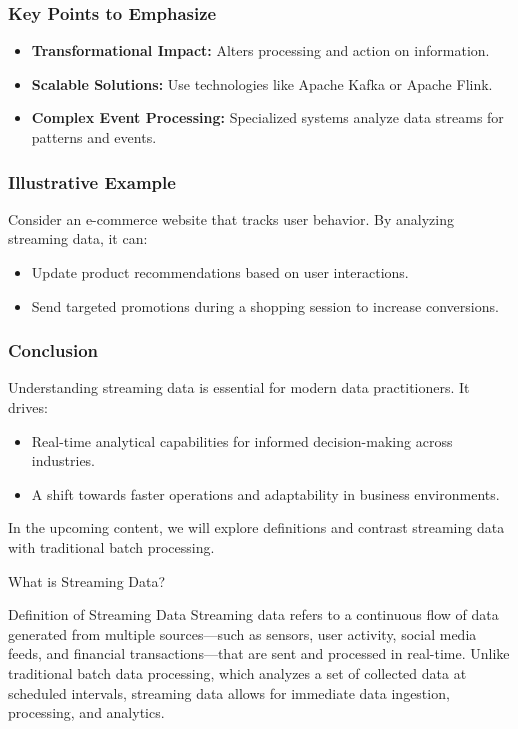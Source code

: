 \documentclass[aspectratio=169]{beamer}
\begin{document}
\begin{frame}[fragile]
    \frametitle{Key Points to Emphasize}
    \begin{itemize}
        \item \textbf{Transformational Impact:} Alters processing and action on information.
        \item \textbf{Scalable Solutions:} Use technologies like Apache Kafka or Apache Flink.
        \item \textbf{Complex Event Processing:} Specialized systems analyze data streams for patterns and events.
    \end{itemize}
\end{frame}

\begin{frame}[fragile]
    \frametitle{Illustrative Example}
    Consider an e-commerce website that tracks user behavior. By analyzing streaming data, it can:
    \begin{itemize}
        \item Update product recommendations based on user interactions.
        \item Send targeted promotions during a shopping session to increase conversions.
    \end{itemize}
\end{frame}

\begin{frame}[fragile]
    \frametitle{Conclusion}
    Understanding streaming data is essential for modern data practitioners. It drives:
    \begin{itemize}
        \item Real-time analytical capabilities for informed decision-making across industries.
        \item A shift towards faster operations and adaptability in business environments.
    \end{itemize}
    In the upcoming content, we will explore definitions and contrast streaming data with traditional batch processing.
\end{frame}

\begin{frame}[fragile]{What is Streaming Data?}
\begin{block}{Definition of Streaming Data}
Streaming data refers to a continuous flow of data generated from multiple sources—such as sensors, user activity, social media feeds, and financial transactions—that are sent and processed in real-time. Unlike traditional batch data processing, which analyzes a set of collected data at scheduled intervals, streaming data allows for immediate data ingestion, processing, and analytics.
\end{block}
\end{frame}
\end{document}
